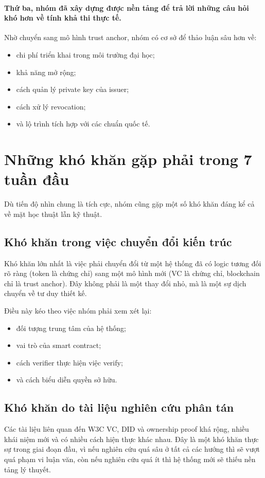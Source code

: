 \paragraph{Thứ ba, nhóm đã xây dựng được nền tảng để trả lời những câu hỏi khó hơn về tính khả thi thực tế.}
Nhờ chuyển sang mô hình trust anchor, nhóm có cơ sở để thảo luận sâu hơn về:
\begin{itemize}
    \item chi phí triển khai trong môi trường đại học;
    \item khả năng mở rộng;
    \item cách quản lý private key của issuer;
    \item cách xử lý revocation;
    \item và lộ trình tích hợp với các chuẩn quốc tế.
\end{itemize}

\section{Những khó khăn gặp phải trong 7 tuần đầu}

Dù tiến độ nhìn chung là tích cực, nhóm cũng gặp một số khó khăn đáng kể cả về mặt học thuật lẫn kỹ thuật.

\subsection{Khó khăn trong việc chuyển đổi kiến trúc}
Khó khăn lớn nhất là việc phải chuyển đổi từ một hệ thống đã có logic tương đối rõ ràng (token là chứng chỉ) sang một mô hình mới (VC là chứng chỉ, blockchain chỉ là trust anchor). Đây không phải là một thay đổi nhỏ, mà là một sự dịch chuyển về tư duy thiết kế.

Điều này kéo theo việc nhóm phải xem xét lại:
\begin{itemize}
    \item đối tượng trung tâm của hệ thống;
    \item vai trò của smart contract;
    \item cách verifier thực hiện việc verify;
    \item và cách biểu diễn quyền sở hữu.
\end{itemize}

\subsection{Khó khăn do tài liệu nghiên cứu phân tán}
Các tài liệu liên quan đến W3C VC, DID và ownership proof khá rộng, nhiều khái niệm mới và có nhiều cách hiện thực khác nhau. Đây là một khó khăn thực sự trong giai đoạn đầu, vì nếu nghiên cứu quá sâu ở tất cả các hướng thì sẽ vượt quá phạm vi luận văn, còn nếu nghiên cứu quá ít thì hệ thống mới sẽ thiếu nền tảng lý thuyết.

